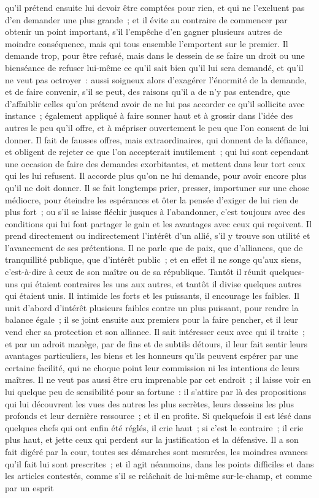 \documentclass[french,twoside]{book} %
\begin{document}
qu’il prétend ensuite lui devoir être comptées pour rien, et qui ne l’excluent pas d’en demander une plus grande ; et il évite au contraire de commencer par obtenir un point important, s’il l’empêche d’en gagner plusieurs autres de moindre conséquence, mais qui tous ensemble l’emportent sur le premier. Il demande trop, pour être refusé, mais dans le dessein de se faire un droit ou une bienséance de refuser lui-même ce qu’il sait bien qu’il lui sera demandé, et qu’il ne veut pas octroyer : aussi soigneux alors d’exagérer l’énormité de la demande, et de faire convenir, s’il se peut, des raisons qu’il a de n’y pas entendre, que d’affaiblir celles qu’on prétend avoir de ne lui pas accorder ce qu’il sollicite avec instance ; également appliqué à faire sonner haut et à grossir dans l’idée des autres le peu qu’il offre, et à mépriser ouvertement le peu que l’on consent de lui donner. Il fait de fausses offres, mais extraordinaires, qui donnent de la défiance, et obligent de rejeter ce que l’on accepterait inutilement ; qui lui sont cependant une occasion de faire des demandes exorbitantes, et mettent dans leur tort ceux qui les lui refusent. Il accorde plus qu’on ne lui demande, pour avoir encore plus qu’il ne doit donner. Il se fait longtemps prier, presser, importuner sur une chose médiocre, pour éteindre les espérances et ôter la pensée d’exiger de lui rien de plus fort ; ou s’il se laisse fléchir jusques à l’abandonner, c’est toujours avec des conditions qui lui font partager le gain et les avantages avec ceux qui reçoivent. Il prend directement ou indirectement l’intérêt d’un allié, s’il y trouve son utilité et l’avancement de ses prétentions. Il ne parle que de paix, que d’alliances, que de tranquillité publique, que d’intérêt public ; et en effet il ne songe qu’aux siens, c’est-à-dire à ceux de son maître ou de sa république. Tantôt il réunit quelques-uns qui étaient contraires les uns aux autres, et tantôt il divise quelques autres qui étaient unis. Il intimide les forts et les puissants, il encourage les faibles. Il unit d’abord d’intérêt plusieurs faibles contre un plus puissant, pour rendre la balance égale ; il se joint ensuite aux premiers pour la faire pencher, et il leur vend cher sa protection et son alliance. Il sait intéresser ceux avec qui il traite ; et par un adroit manège, par de fins et de subtils détours, il leur fait sentir leurs avantages particuliers, les biens et les honneurs qu’ils peuvent espérer par une certaine facilité, qui ne choque point leur commission ni les intentions de leurs maîtres. Il ne veut pas aussi être cru imprenable par cet endroit ; il laisse voir en lui quelque peu de sensibilité pour sa fortune : il s’attire par là des propositions qui lui découvrent les vues des autres les plus secrètes, leurs desseins les plus profonds et leur dernière ressource ; et il en profite. Si quelquefois il est lésé dans quelques chefs qui ont enfin été réglés, il crie haut ; si c’est le contraire ; il crie plus haut, et jette ceux qui perdent sur la justification et la défensive. Il a son fait digéré par la cour, toutes ses démarches sont mesurées, les moindres avances qu’il fait lui sont prescrites ; et il agit néanmoins, dans les points difficiles et dans les articles contestés, comme s’il se relâchait de lui-même sur-le-champ, et comme par un esprit 
\end{document}

